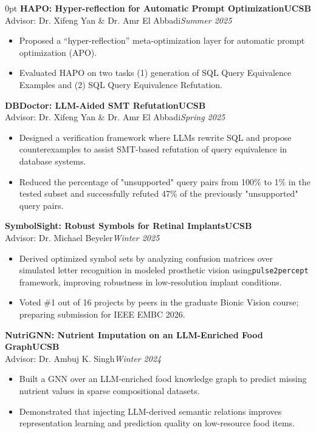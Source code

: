 \documentclass[11pt]{article}
\newlength{\sectionwidth}
\newcommand{\CVSection}[2]{%
  \vspace{1.4em} 
  \noindent
  \makebox[0pt][l]{%
    \parbox[t]{\sectionwidth}{%
      \raggedright\scshape\bfseries\small #1%
    }%
  }%
  \begin{adjustwidth}{\sectionwidth}{0pt}
    #2
  \end{adjustwidth}
}
\newcommand{\CVEntry}[4]{%
  \vspace{0.4em} %
  {\bfseries #1}\hfill {\bfseries #2}\\[0.1em] 
  #3\hfill \textit{#4}
}
\begin{document}
\CVSection{Projects}{%
\CVEntry
{HAPO: Hyper-reflection for Automatic Prompt Optimization}
    {UCSB}
    {Advisor: Dr. Xifeng Yan \& Dr. Amr El Abbadi}
    {Summer 2025}
  \begin{itemize}
    \item Proposed a ``hyper-reflection'' meta-optimization layer for automatic prompt optimization (APO).
    \item Evaluated HAPO on two tasks (1) generation of SQL Query Equivalence Examples and (2) SQL Query Equivalence Refutation. 
  \end{itemize}
\CVEntry
{DBDoctor: LLM-Aided SMT Refutation}
    {UCSB}
    {Advisor: Dr. Xifeng Yan \& Dr. Amr El Abbadi}
    {Spring 2025}
  \begin{itemize}
    \item Designed a verification framework where LLMs rewrite SQL and propose counterexamples to assist SMT-based refutation of query equivalence in database systems.
    \item Reduced the percentage of "unsupported" query pairs from 100\% to 1\% in the tested subset and successfully refuted 47\% of the previously "unsupported" query pairs.
  \end{itemize}
\CVEntry
    {SymbolSight: Robust Symbols for Retinal Implants}
    {UCSB}
    {Advisor: Dr. Michael Beyeler}
    {Winter 2025}
  \begin{itemize}
    \item Derived optimized symbol sets by analyzing confusion matrices over simulated letter recognition in modeled prosthetic vision using\texttt{pulse2percept} framework, improving robustness in low-resolution implant conditions.
    \item Voted \#1 out of 16 projects by peers in the graduate Bionic Vision course; preparing submission for IEEE EMBC 2026.
  \end{itemize}
\CVEntry
    {NutriGNN: Nutrient Imputation on an LLM-Enriched Food Graph}
    {UCSB}
    {Advisor: Dr. Ambuj K. Singh}
    {Winter 2024}
  \begin{itemize}
    \item Built a GNN over an LLM-enriched food knowledge graph to predict missing nutrient values in sparse compositional datasets.
    \item Demonstrated that injecting LLM-derived semantic relations improves representation learning and prediction quality on low-resource food items.

\end{itemize}}
\end{document}
